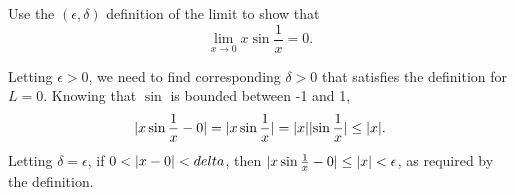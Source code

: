 \begin{example}
	Use the $(\epsilon, \delta)$ definition of the limit to show that
	\begin{equation*}
		\lim_{x\to 0}{x\sin{\frac{1}{x}}} = 0.
	\end{equation*}
\end{example}
Letting $\epsilon > 0$, we need to find corresponding $\delta > 0$ that satisfies the definition for $L = 0$.
Knowing that $\sin$ is bounded between -1 and 1,
\begin{equation*}
	\lvert x\sin{\frac{1}{x}} - 0 \rvert = \lvert x\sin{\frac{1}{x}} \rvert = \lvert x \rvert\lvert \sin{\frac{1}{x}} \rvert \leq \lvert x \rvert.
\end{equation*}
Letting $\delta = \epsilon$, if $0 < \lvert x - 0 \rvert < delta$, then $\lvert x\sin{\frac{1}{x}} - 0 \rvert \leq \lvert x \rvert < \epsilon$, as required by the definition.